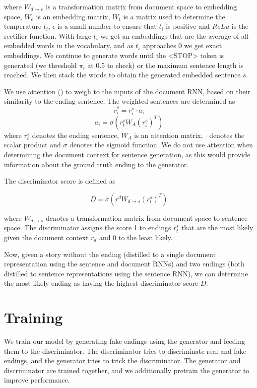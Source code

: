 \documentclass{article}
\begin{document}
where $W_{d \rightarrow e}$ is a transformation matrix from document space to embedding space, $W_{e}$ is an embedding matrix, $W_{t}$ is a matrix used to determine the temperature $t_{i}$, $\epsilon$ is a small number to ensure that $t_{i}$ is positive and $ReLu$ is the rectifier function. With large $t_{i}$ we get an embeddings that are the average of all embedded words in the vocabulary, and as $t_{i}$ approaches 0 we get exact embeddings. We continue to generate words until the <STOP> token is generated (we threshold $\pi_{i}$ at 0.5 to check) or the maximum sentence length is reached. We then stack the words to obtain the generated embedded sentence $\bar{s}$.

We use attention (\cite{P16-1122}) to weigh to the inputs of the document RNN, based on their similarity to the ending sentence. The weighted sentences are determined as
$$ \tilde{r}^{s}_{i} = r^{s}_{i} \cdot a_{i} $$
$$ a_{i} = \sigma(r^{s}_{t}W_{A}(r^{s}_{i})^{T}) $$
where $r^{s}_{t}$ denotes the ending sentence, $W_{A}$ is an attention matrix, $\cdot$ denotes the scalar product and $\sigma$ denotes the sigmoid function. We do not use attention when determining the document context for sentence generation, as this would provide information about the ground truth ending to the generator.

The discriminator score is defined as 

$$ D = \sigma(r^{d}W_{d \rightarrow s}(r^{s}_{t})^{T} )$$

where $W_{d \rightarrow s}$ denotes a transformation matrix from document space to sentence space. The discriminator assigns the score 1 to endings $r^{s}_{t}$ that are the most likely given the document context $r_{d}$ and 0 to the least likely.

Now, given a story without the ending (distilled to a single document representation using the sentence and document RNNs) and two endings (both distilled to sentence representations using the sentence RNN), we can determine the most likely ending as having the highest discriminator score $D$. 

\section{Training}

We train our model by generating fake endings using the generator and feeding them to the discriminator. The discriminator tries to discriminate real and fake endings, and the generator tries to trick the discriminator. The generator and discriminator are trained together, and we additionally pretrain the generator to improve performance.
\end{document}
